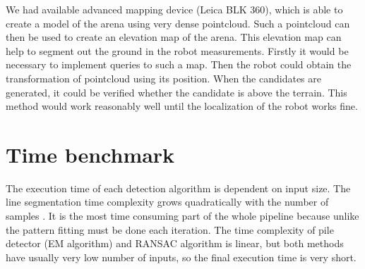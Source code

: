 We had available advanced mapping device (Leica BLK 360), which is able to create a model of the arena using very dense pointcloud. Such a pointcloud can then be used to create an elevation map of the arena. This elevation map can help to segment out the ground in the robot measurements. Firstly it would be necessary to implement queries to such a map. Then the robot could obtain the transformation of pointcloud using its position. When the candidates are generated, it could be verified whether the candidate is above the terrain. This method would work reasonably well until the localization of the robot works fine.

\section{Time benchmark}
The execution time of each detection algorithm is dependent on input size. The line segmentation time complexity grows quadratically with the number of samples \cite{hershberger2000}. It is the most time consuming part of the whole pipeline because unlike the pattern fitting must be done each iteration. The time complexity of pile detector (EM algorithm) and RANSAC algorithm is linear, but both methods have usually very low number of inputs, so the final execution time is very short. 

